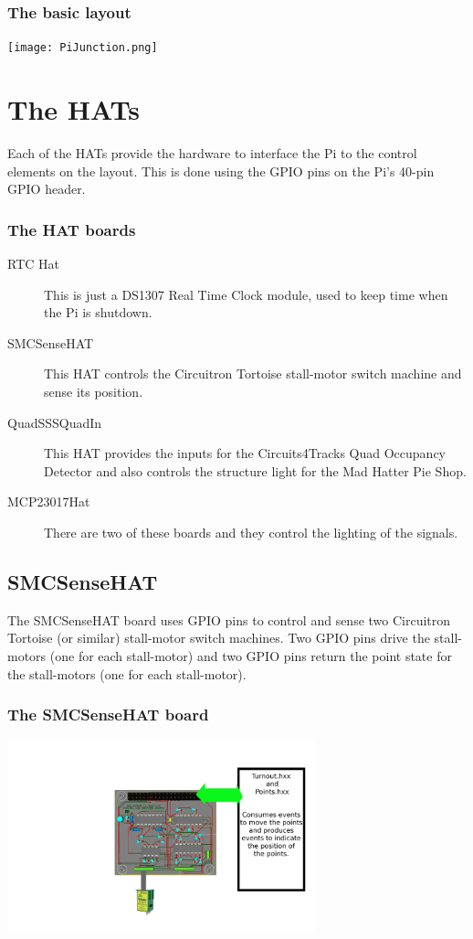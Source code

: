 \begin{frame}
   \frametitle{The basic layout}
   \texttt{[image: PiJunction.png]}
\end{frame}

\section{The HATs}

Each of the HATs provide the hardware to interface the Pi to the control
elements on the layout. This is done using the GPIO pins on the Pi's 40-pin
GPIO header.  

\begin{frame}
   \frametitle{The HAT boards}
   \begin{description}
   \item[RTC Hat] This is just a DS1307 Real Time Clock module, used to keep 
   time when the Pi is shutdown.
   \item[SMCSenseHAT] This HAT controls the Circuitron Tortoise stall-motor 
   switch machine and sense its position.
   \item[QuadSSSQuadIn] This HAT provides the inputs for the Circuits4Tracks 
   Quad Occupancy Detector and also controls the structure light for the Mad 
   Hatter Pie Shop.
   \item[MCP23017Hat] There are two of these boards and they control the 
   lighting of the signals.
   \end{description}
\end{frame}

\subsection{SMCSenseHAT}

The SMCSenseHAT board uses GPIO pins to control and sense two Circuitron
Tortoise (or similar) stall-motor switch machines. Two GPIO pins drive the
stall-motors (one for each stall-motor) and two GPIO pins return the point
state for the stall-motors (one for each stall-motor). 

\begin{frame}
    \frametitle{The SMCSenseHAT board}
    \includegraphics[width=3.5in]{SMCSenseHAT-frame.png}
\end{frame}


